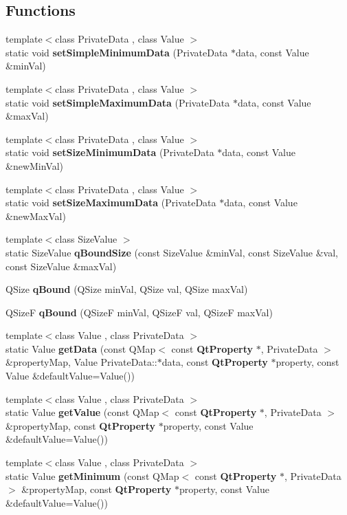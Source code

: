 \subsection*{Functions}
\begin{DoxyCompactItemize}
\item 
{\footnotesize template$<$class Private\+Data , class Value $>$ }\\static void {\bf set\+Simple\+Minimum\+Data} (Private\+Data $\ast$data, const Value \&min\+Val)
\item 
{\footnotesize template$<$class Private\+Data , class Value $>$ }\\static void {\bf set\+Simple\+Maximum\+Data} (Private\+Data $\ast$data, const Value \&max\+Val)
\item 
{\footnotesize template$<$class Private\+Data , class Value $>$ }\\static void {\bf set\+Size\+Minimum\+Data} (Private\+Data $\ast$data, const Value \&new\+Min\+Val)
\item 
{\footnotesize template$<$class Private\+Data , class Value $>$ }\\static void {\bf set\+Size\+Maximum\+Data} (Private\+Data $\ast$data, const Value \&new\+Max\+Val)
\item 
{\footnotesize template$<$class Size\+Value $>$ }\\static Size\+Value {\bf q\+Bound\+Size} (const Size\+Value \&min\+Val, const Size\+Value \&val, const Size\+Value \&max\+Val)
\item 
Q\+Size {\bf q\+Bound} (Q\+Size min\+Val, Q\+Size val, Q\+Size max\+Val)
\item 
Q\+SizeF {\bf q\+Bound} (Q\+SizeF min\+Val, Q\+SizeF val, Q\+SizeF max\+Val)
\item 
{\footnotesize template$<$class Value , class Private\+Data $>$ }\\static Value {\bf get\+Data} (const Q\+Map$<$ const {\bf Qt\+Property} $\ast$, Private\+Data $>$ \&property\+Map, Value Private\+Data\+::$\ast$data, const {\bf Qt\+Property} $\ast$property, const Value \&default\+Value=Value())
\item 
{\footnotesize template$<$class Value , class Private\+Data $>$ }\\static Value {\bf get\+Value} (const Q\+Map$<$ const {\bf Qt\+Property} $\ast$, Private\+Data $>$ \&property\+Map, const {\bf Qt\+Property} $\ast$property, const Value \&default\+Value=Value())
\item 
{\footnotesize template$<$class Value , class Private\+Data $>$ }\\static Value {\bf get\+Minimum} (const Q\+Map$<$ const {\bf Qt\+Property} $\ast$, Private\+Data $>$ \&property\+Map, const {\bf Qt\+Property} $\ast$property, const Value \&default\+Value=Value())

\end{DoxyCompactItemize}
